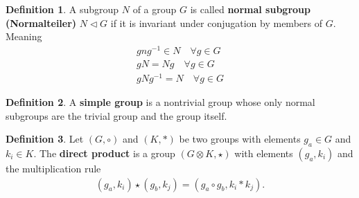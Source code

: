 \documentclass[10pt,a4paper]{book}
\theoremstyle{definition}
\newtheorem{definition}{Definition}[section]
\begin{document}
\begin{definition}{}
A subgroup $N$ of a group $G$ is called {\bf normal subgroup (Normalteiler)} $N\vartriangleleft G$ if it is invariant under conjugation by members of $G$. Meaning
\begin{align}
    gng^{-1}\in N\quad \forall g\in G\\
    gN=Ng  \quad \forall g\in G\\
    gNg^{-1}=N  \quad \forall g\in G
\end{align}
\end{definition}

\begin{definition}{}
A {\bf simple group} is a nontrivial group whose only normal subgroups are the trivial group and the group itself.
\end{definition}

\begin{definition}{}
Let $(G,\circ)$ and $(K,*)$ be two groups with elements $g_a\in G$ and $k_i\in K$. The {\bf direct product} is a group $(G\otimes K,\star)$ with elements $(g_a,k_i)$ and the multiplication rule
\begin{align}
(g_a,k_i)\star(g_b,k_j)=(g_a\circ g_b,k_i*k_j).
\end{align}
\end{definition}
\end{document}
